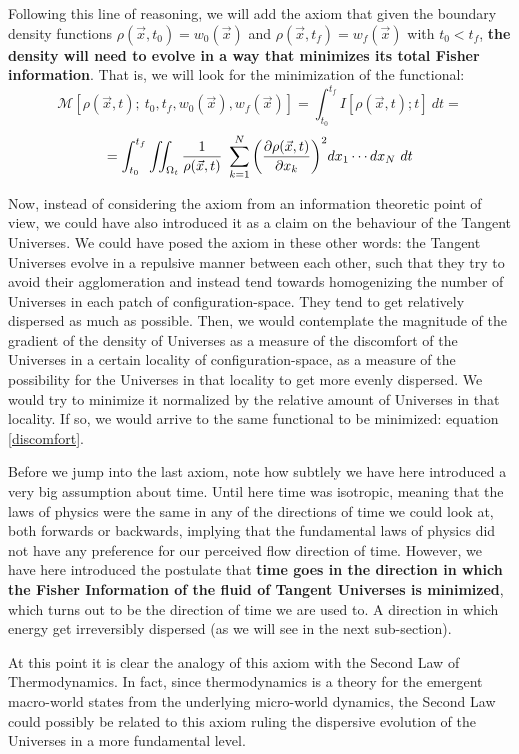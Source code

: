 \documentclass[11pt, a4paper]{article} %
\newcommand{\M}{\mathcal{M}}
\begin{document}
Following this line of reasoning, we will add the axiom that given the boundary density functions $\rho(\vec{x},t_0)=w_0(\vec{x})$ and $\rho(\vec{x},t_f)=w_f(\vec{x})$ with $t_0<t_f$, {\bf the density will need to evolve in a way that minimizes its total Fisher information}. That is, we will look for the minimization of the functional:
\begin{equation}\label{discomfort}
\M[\rho(\vec{x},t);\ t_0,t_f,w_0(\vec{x}), w_f(\vec{x})]=\int_{t_0}^{t_f} I[\rho(\vec{x},t);t]\ dt=
\end{equation} 
$$
=\int_{t_0}^{t_f} \iint_{\Omega_t} \frac{1}{\rho(\vec{x},t)}\ \sum_{k=1}^N \qty(\pdv{\rho(\vec{x},t)}{x_k})^2 dx_1\cdots dx_N\ dt
$$

Now, instead of considering the axiom from an information theoretic point of view, we could have also introduced it as a claim on the behaviour of the Tangent Universes. We could have posed the axiom in these other words: the Tangent Universes evolve in a repulsive manner between each other, such that they try to avoid their agglomeration and instead tend towards homogenizing the number of Universes in each patch of configuration-space. They tend to get relatively dispersed as much as possible. Then, we would contemplate the magnitude of the gradient of the density of Universes as a measure of the discomfort of the Universes in a certain locality of configuration-space, as a measure of the possibility for the Universes in that locality to get more evenly dispersed. We would try to minimize it normalized by the relative amount of Universes in that locality. If so, we would arrive to the same functional to be minimized: equation \eqref{discomfort}.

Before we jump into the last axiom, note how subtlely we have here introduced a very big assumption about time. Until here time was isotropic, meaning that the laws of physics were the same in any of the directions of time we could look at, both forwards or backwards, implying that the fundamental laws of physics did not have any preference for our perceived flow direction of time. However, we have here introduced the postulate that {\bf time goes in the direction in which the Fisher Information of the fluid of Tangent Universes is minimized}, which turns out to be the direction of time we are used to. A direction in which energy get irreversibly dispersed (as we will see in the next sub-section).

At this point it is clear the analogy of this axiom with the Second Law of Thermodynamics. In fact, since thermodynamics is a theory for the emergent macro-world states from the underlying micro-world dynamics, the Second Law could possibly be related to this axiom ruling the dispersive evolution of the Universes in a more fundamental level.
\end{document}
